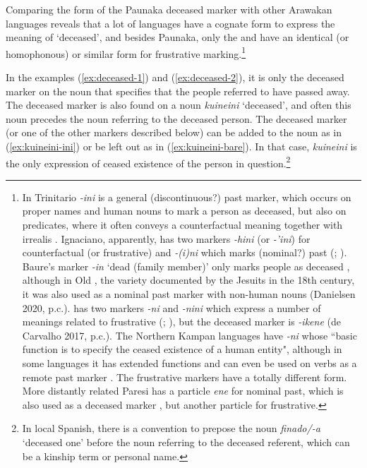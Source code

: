 Comparing the form of the Paunaka deceased marker with other Arawakan languages  reveals that a lot of languages have a cognate form to express the meaning of ‘deceased’, and besides Paunaka, only the  and  have an identical (or homophonous) or similar form for frustrative marking.\footnote{In Trinitario \textit{-ini} is a general (discontinuous?) past marker, which occurs on proper names and human nouns to mark a person as deceased, but also on predicates, where it often conveys a counterfactual meaning together with irrealis \citep[cf.][80,81]{Rose2014a}. Ignaciano, apparently, has two markers \textit{-hini} (or \textit{-'ini}) for counterfactual (or frustrative) and \textit{-(i)ni} which marks (nominal?) past (\citealt[cf.][153, 157]{OlzaZubiri2004}; \citealt[35]{Jorda2014}). Baure’s marker \textit{-in} ‘dead (family member)’ only marks people as deceased \citep[cf.][115]{Danielsen2007}, although in Old , the variety documented by the Jesuits in the 18th century, it was also used as a nominal past marker with non-human nouns (Danielsen 2020, p.c.).  has two markers \textit{-ni} and \textit{-nini} which express a number of meanings related to frustrative (\citealt[cf.][55, 84]{ButlerEkdahl2014}; \citealt[7]{Butler2007}), but the deceased marker is \textit{-ikene} (de Carvalho 2017, p.c.). %
 The Northern Kampan languages have \textit{-ni} whose “basic function is to specify the ceased existence of a human entity", although in some languages it has extended functions and can even be used on verbs as a remote past marker \citep[793]{Mihas2017}. The frustrative markers have a totally different form. More distantly related Paresi has a particle \textit{ene} for nominal past, which is also used as a deceased marker \citep[289]{Brandao2014}, but another particle for frustrative.}


In the examples (\ref{ex:deceased-1}) and (\ref{ex:deceased-2}), it is only the deceased marker on the noun that specifies that the people referred to have passed away. The deceased marker is also found on a noun \textit{kuineini} ‘deceased’, and often this noun precedes the noun referring to the deceased person. The deceased marker (or one of the other markers described below) can be added to the noun as in (\ref{ex:kuineini-ini}) or be left out as in (\ref{ex:kuineini-bare}). In that case, \textit{kuineini} is the only expression of ceased existence of the person in question.\footnote{In local Spanish, there is a convention to prepose the noun \textit{finado/-a} ‘deceased one’ before the noun referring to the deceased referent, which can be a kinship term or personal name.} 

